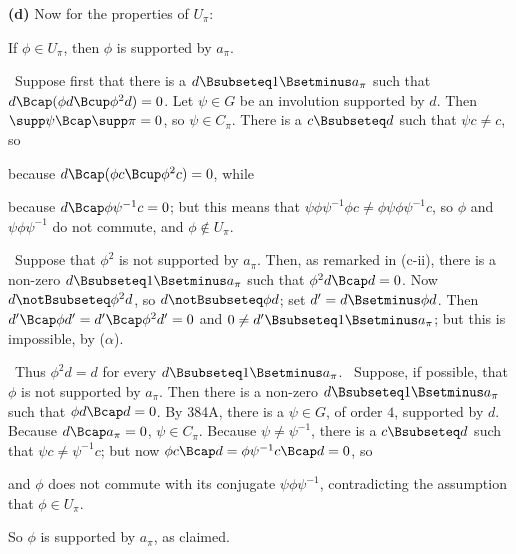 {{\bf (d)} Now for the properties of $U_{\pi}$:
     
\medskip
     
 If $\phi\in U_{\pi}$, then $\phi$ is supported by
$a_{\pi}$.
     
\quad\Prf\grheada\Quer\ Suppose first that there is a 
$d\Bsubseteq 1\Bsetminus a_{\pi}$ such that 
$d\Bcap(\phi d\Bcup\phi^2d)=0$.   Let
$\psi\in G$ be an involution supported by $d$.   Then
$\supp\psi\Bcap\supp\pi=0$, so
$\psi\in C_{\pi}$.   There is a $c\Bsubseteq d$ such that $\psi c\ne c$,
so
     
     
\noindent because $d\Bcap(\phi c\Bcup\phi^2c)=0$, while
     
     
\noindent because $d\Bcap\phi\psi^{-1}c=0$;  but this means that
$\psi\phi\psi^{-1}\phi c\ne\phi\psi\phi\psi^{-1}c$, so $\phi$ and
$\psi\phi\psi^{-1}$ do not commute, and $\phi\notin U_{\pi}$.\ \Bang
     
\qquad\grheadb\Quer\ Suppose that $\phi^2$ is not supported by
$a_{\pi}$.   Then, as remarked in (c-ii), there is a non-zero $d\Bsubseteq 1\Bsetminus a_{\pi}$ such that $\phi^2d\Bcap d=0$.   Now $d\notBsubseteq\phi^2d$, so $d\notBsubseteq\phi d$;  set $d'=d\Bsetminus\phi d$.   Then
$d'\Bcap\phi d'=d'\Bcap\phi^2d'=0$ and 
$0\ne d'\Bsubseteq 1\Bsetminus a_{\pi}$;  but this is impossible, by ($\alpha$).\ \Bang
     
\qquad\grheadc\ Thus $\phi^2d=d$ for every 
$d\Bsubseteq 1\Bsetminus a_{\pi}$.   \Quer\ Suppose, if possible, that $\phi$ is not supported by
$a_{\pi}$.   Then there is a non-zero $d\Bsubseteq 1\Bsetminus a_{\pi}$
such that $\phi d\Bcap d=0$.   By 384A, there is a $\psi\in G$, of order
$4$, supported by $d$.   Because $d\Bcap a_{\pi}=0$, $\psi\in C_{\pi}$.
Because $\psi\ne\psi^{-1}$, there is a $c\Bsubseteq d$ such that $\psi
c\ne\psi^{-1}c$;  but now $\phi c\Bcap d=\phi\psi^{-1}c\Bcap d=0$, so
     
     
\noindent and $\phi$ does not commute with its conjugate
$\psi\phi\psi^{-1}$, contradicting the assumption that $\phi\in
U_{\pi}$.\ \Bang
     
So $\phi$ is supported by $a_{\pi}$, as claimed.\ \Qed
     
}
